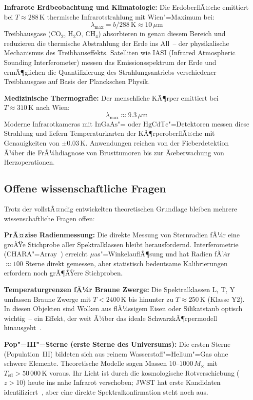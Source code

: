 ﻿\documentclass[a4paper,12pt]{article}
\theoremstyle{definition}
\begin{document}
\textbf{Infrarote Erdbeobachtung und Klimatologie:}
Die ErdoberflÃ¤che emittiert bei $T \approx 288\,\text{K}$ thermische
Infrarotstrahlung mit Wien"=Maximum bei:
\[
    \lambda_{\max} = b/288\,\text{K} \approx 10\,\mu\text{m}
\]
Treibhausgase (CO$_2$, H$_2$O, CH$_4$) absorbieren in genau diesem
Bereich und reduzieren die thermische Abstrahlung der Erde ins All~--
der physikalische Mechanismus des Treibhauseffekts. Satelliten wie
IASI (Infrared Atmospheric Sounding Interferometer) messen das Emissionsspektrum
der Erde und ermÃ¶glichen die Quantifizierung des Strahlungsantriebs
verschiedener Treibhausgase auf Basis der Planckschen Physik.

\textbf{Medizinische Thermografie:}
Der menschliche KÃ¶rper emittiert bei $T \approx 310\,\text{K}$ nach Wien:
\[
    \lambda_{\max} \approx 9.3\,\mu\text{m}
\]
Moderne Infrarotkameras mit $\text{InGaAs}$"= oder $\text{HgCdTe}$"=Detektoren
messen diese Strahlung und liefern Temperaturkarten der KÃ¶rperoberflÃ¤che
mit Genauigkeiten von $\pm 0.03\,\text{K}$. Anwendungen reichen von
der Fieberdetektion Ã¼ber die FrÃ¼hdiagnose von Brusttumoren bis zur
Ãœberwachung von Herzoperationen.

\subsection{Offene wissenschaftliche Fragen}

Trotz der vollstÃ¤ndig entwickelten theoretischen Grundlage bleiben
mehrere wissenschaftliche Fragen offen:

\textbf{PrÃ¤zise Radienmessung:} Die direkte Messung von Sternradien
fÃ¼r eine groÃŸe Stichprobe aller Spektralklassen bleibt herausfordernd.
Interferometrie (CHARA"=Array~\cite{ten_brummelaar2005}) erreicht
$\mu$as"=WinkelauflÃ¶sung und hat Radien fÃ¼r $\approx 100$ Sterne direkt
gemessen, aber statistisch bedeutsame Kalibrierungen erfordern noch
grÃ¶ÃŸere Stichproben.

\textbf{Temperaturgrenzen fÃ¼r Braune Zwerge:} Die Spektralklassen L, T, Y
umfassen Braune Zwerge mit $T < 2400\,\text{K}$ bis hinunter zu
$T \approx 250\,\text{K}$ (Klasse Y2). In diesen Objekten sind Wolken
aus flÃ¼ssigem Eisen oder Silikatstaub optisch wichtig~-- ein Effekt,
der weit Ã¼ber das ideale SchwarzkÃ¶rpermodell hinausgeht~\cite{cushing2011}.

\textbf{Pop"=III"=Sterne (erste Sterne des Universums):} Die ersten Sterne
(Population~III) bildeten sich aus reinem Wasserstoff"=Helium"=Gas ohne
schwere Elemente. Theoretische Modelle sagen Massen $10$--$1000\,M_\odot$
mit $T_{\text{eff}} > 50\,000\,\text{K}$ voraus. Ihr Licht ist durch
die kosmologische Rotverschiebung ($z > 10$) heute ins nahe Infrarot
verschoben; JWST hat erste Kandidaten identifiziert~\cite{castellano2022},
aber eine direkte Spektralkonfirmation steht noch aus.
\end{document}

